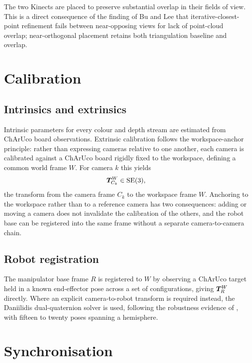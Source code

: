 The two Kinects are placed to preserve substantial overlap in their fields of
view. This is a direct consequence of the finding of Bu and Lee \cite{bulee}
that iterative-closest-point refinement fails between near-opposing views for
lack of point-cloud overlap; near-orthogonal placement retains both
triangulation baseline and overlap.

\section{Calibration}
\label{sec:calib}

\subsection{Intrinsics and extrinsics}

Intrinsic parameters for every colour and depth stream are estimated from
ChArUco board observations. Extrinsic calibration follows the workspace-anchor
principle: rather than expressing cameras relative to one another, each camera
is calibrated against a ChArUco board rigidly fixed to the workspace, defining
a common world frame $W$. For camera $k$ this yields
\begin{equation}
  \bm{T}^{W}_{C_k} \in \mathrm{SE}(3),
  \label{eq:extrinsic}
\end{equation}
the transform from the camera frame $C_k$ to the workspace frame $W$. Anchoring
to the workspace rather than to a reference camera has two consequences: adding
or moving a camera does not invalidate the calibration of the others, and the
robot base can be registered into the same frame without a separate
camera-to-camera chain.

\subsection{Robot registration}

The manipulator base frame $R$ is registered to $W$ by observing a ChArUco
target held in a known end-effector pose across a set of configurations, giving
$\bm{T}^{W}_{R}$ directly. Where an explicit camera-to-robot transform is required
instead, the Daniilidis dual-quaternion solver is used, following the
robustness evidence of \cite{alihandeye}, with fifteen to twenty poses spanning
a hemisphere.

\section{Synchronisation}
\label{sec:sync}

